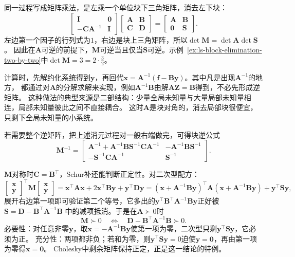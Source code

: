 同一过程写成矩阵乘法，是左乘一个单位块下三角矩阵，消去左下块：
\[
 \begin{bmatrix}\bm I&\bm0\\-\bm C\bm A^{-1}&\bm I\end{bmatrix}
 \begin{bmatrix}\bm A&\bm B\\\bm C&\bm D\end{bmatrix}
 =\begin{bmatrix}\bm A&\bm B\\\bm0&\bm S\end{bmatrix}.
\]
左边第一个因子的行列式为$1$，右边是块上三角矩阵，所以$\det\bm M=\det\bm A\det\bm S$。
因此在$\bm A$可逆的前提下，$\bm M$可逆当且仅当$\bm S$可逆。示例~\ref{ex:ls-block-elimination-two-by-two}中$\det\bm M=3=2\cdot\tfrac32$。

计算时，先解约化系统得到$\bm y$，再回代$\bm x=\bm A^{-1}(\bm f-\bm B\bm y)$。其中凡是出现$\bm A^{-1}$的地方，
都通过对$\bm A$的分解求解来实现，例如$\bm A^{-1}\bm B$由解$\bm A\bm Z=\bm B$得到，不必先形成逆矩阵。
这种做法的典型来源是二部结构：少量全局未知量与大量局部未知量相连，局部未知量彼此之间不直接耦合。
这时$\bm A$是块对角的，消去局部块很便宜，只剩下全局未知量的小系统。

若需要整个逆矩阵，把上述消元过程对一般右端做完，可得块逆公式
\begin{equation}
 \bm M^{-1}=
 \begin{bmatrix}
  \bm A^{-1}+\bm A^{-1}\bm B\bm S^{-1}\bm C\bm A^{-1}
  &-\bm A^{-1}\bm B\bm S^{-1}\\
  -\bm S^{-1}\bm C\bm A^{-1}&\bm S^{-1}
 \end{bmatrix}.
 \label{eq:matrix-analysis-block-inverse}
\end{equation}

$\bm M$对称时$\bm C=\bm B^\top$，Schur补还能判断正定性。对二次型配方：
\begin{equation}
 \begin{bmatrix}\bm x\\\bm y\end{bmatrix}^{\top}
 \bm M\begin{bmatrix}\bm x\\\bm y\end{bmatrix}
 =\bm x^\top\bm A\bm x+2\bm x^\top\bm B\bm y+\bm y^\top\bm D\bm y
 =(\bm x+\bm A^{-1}\bm B\bm y)^\top
 \bm A(\bm x+\bm A^{-1}\bm B\bm y)+\bm y^\top\bm S\bm y,
\end{equation}
展开右边第一项即可验证第二个等号，它多出的$\bm y^\top\bm B^\top\bm A^{-1}\bm B\bm y$正好被$\bm S=\bm D-\bm B^\top\bm A^{-1}\bm B$
中的减项抵消。于是在$\bm A\succ0$时
\begin{equation}
 \bm M\succ0\quad\Longleftrightarrow\quad
 \bm D-\bm B^\top\bm A^{-1}\bm B\succ0.
 \label{eq:matrix-analysis-schur-positive-definite}
\end{equation}
必要性：对任意非零$\bm y$，取$\bm x=-\bm A^{-1}\bm B\bm y$使第一项为零，二次型只剩$\bm y^\top\bm S\bm y$，它必须为正。
充分性：两项都非负；若和为零，则$\bm y^\top\bm S\bm y=0$迫使$\bm y=\bm0$，再由第一项为零得$\bm x=\bm0$。
Cholesky中剩余矩阵保持正定，正是这一结论的特例。

